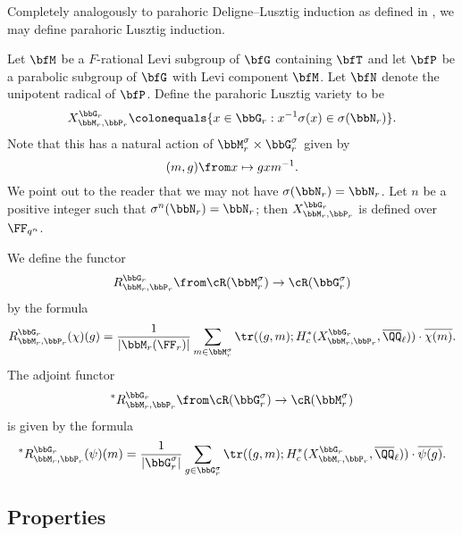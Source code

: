 Completely analogously to parahoric Deligne--Lusztig induction as defined in \cite{Lus04,Sta09,CI21-RT}, we may define parahoric Lusztig induction.

\begin{definition}
  Let $\bfM$ be a $F$-rational Levi subgroup of $\bfG$ containing $\bfT$ and let $\bfP$ be a parabolic subgroup of $\bfG$ with Levi component $\bfM$. Let $\bfN$ denote the unipotent radical of $\bfP$. Define the parahoric Lusztig variety to be
  \begin{equation*}
    X_{\bbM_r, \bbP_r}^{\bbG_r} \colonequals \{x \in \bbG_r : x^{-1}\sigma(x) \in \sigma(\bbN_r)\}.
  \end{equation*}
  Note that this has a natural action of $\bbM_r^\sigma \times \bbG_r^\sigma$ given by
  \begin{equation*}
    (m,g) \from x \mapsto gxm^{-1}.
  \end{equation*}
  We point out to the reader that we may not have $\sigma(\bbN_r) = \bbN_r$. Let $n$ be a positive integer such that $\sigma^n(\bbN_r) = \bbN_r$; then $X_{\bbM_r,\bbP_r}^{\bbG_r}$ is defined over $\FF_{q^n}$.
\end{definition}

\begin{definition}\label{def:induction}
  We define the functor
  \begin{equation*}
    R_{\bbM_r, \bbP_r}^{\bbG_r} \from \cR(\bbM_r^\sigma) \to \cR(\bbG_r^\sigma)
  \end{equation*}
  by the formula
  \begin{equation*}
    R_{\bbM_r,\bbP_r}^{\bbG_r}(\chi)(g) = \frac{1}{|\bbM_r(\FF_r)|} \sum_{m \in \bbM_r^\sigma} \tr((g,m) ; H_c^*(X_{\bbM_r, \bbP_r}^{\bbG_r}, \overline \QQ_\ell)) \cdot \overline{\chi(m)}.
  \end{equation*}
  The adjoint functor 
  \begin{equation*}
    {}^* R_{\bbM_r,\bbP_r}^{\bbG_r} \from \cR(\bbG_r^\sigma) \to \cR(\bbM_r^\sigma)
  \end{equation*}
  is given by the formula
  \begin{equation*}
    {}^* R_{\bbM_r,\bbP_r}^{\bbG_r}(\psi)(m) = \frac{1}{|\bbG_r^\sigma|} \sum_{g \in \bbG_r^\sigma} \tr((g,m); H_c^*(X_{\bbM_r,\bbP_r}^{\bbG_r}, \overline \QQ_\ell)) \cdot \overline{\psi(g)}.
  \end{equation*}
\end{definition}

\subsection{Properties}

